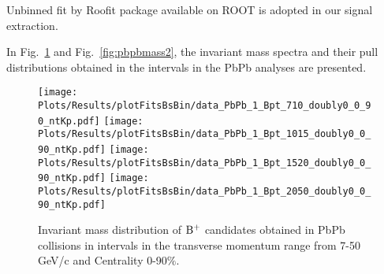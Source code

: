 Unbinned fit by Roofit package available on ROOT is adopted in our signal extraction. 
\fi

In Fig.~\ref{fig:pbpbmass1} and Fig.~\ref{fig:pbpbmass2}, the invariant mass spectra and their pull distributions obtained in the \pt intervals in the PbPb analyses are presented. %

\iffalse
\begin{figure}[h]
\begin{center}
\texttt{[image: Plots/Results/plotFits/data\_PbPb\_1\_Bpt\_57\_doubly0\_ntKp.pdf]}
\texttt{[image: Plots/Results/plotFits/data\_PbPb\_2\_Bpt\_710\_doubly0\_ntKp.pdf]}
\texttt{[image: Plots/Results/plotFits/data\_PbPb\_3\_Bpt\_1015\_doubly0\_ntKp.pdf]}
\texttt{[image: Plots/Results/plotFits/data\_PbPb\_4\_Bpt\_1520\_doubly0\_ntKp.pdf]}
\caption{Invariant mass distribution of $\Bplus$ candidates obtained in PbPb collisions in \pt intervals in the transverse momentum range from 5-20 GeV/c and Centrality 0-90$\%$.}
\label{fig:pbpbmass1}
\end{center}
\end{figure}

\begin{figure}[h]
\begin{center}
\texttt{[image: Plots/Results/plotFits/data\_PbPb\_5\_Bpt\_2030\_doubly0\_ntKp.pdf]}
\texttt{[image: Plots/Results/plotFits/data\_PbPb\_6\_Bpt\_3040\_doubly0\_ntKp.pdf]}
\texttt{[image: Plots/Results/plotFits/data\_PbPb\_7\_Bpt\_4050\_doubly0\_ntKp.pdf]}
\texttt{[image: Plots/Results/plotFits/data\_PbPb\_8\_Bpt\_5060\_doubly0\_ntKp.pdf]}
\caption{Invariant mass distribution of $\Bplus$ candidates obtained in PbPb collisions in \pt intervals in the transverse momentum range from 20-60 GeV/c and Centrality 0-90$\%$.}
\label{fig:pbpbmass2}
\end{center}
\end{figure}
\fi

\begin{figure}[h]
\begin{center}
\texttt{[image: Plots/Results/plotFitsBsBin/data\_PbPb\_1\_Bpt\_710\_doubly0\_0\_90\_ntKp.pdf]}
\texttt{[image: Plots/Results/plotFitsBsBin/data\_PbPb\_1\_Bpt\_1015\_doubly0\_0\_90\_ntKp.pdf]}
\texttt{[image: Plots/Results/plotFitsBsBin/data\_PbPb\_1\_Bpt\_1520\_doubly0\_0\_90\_ntKp.pdf]}
\texttt{[image: Plots/Results/plotFitsBsBin/data\_PbPb\_1\_Bpt\_2050\_doubly0\_0\_90\_ntKp.pdf]}
\caption{Invariant mass distribution of $\Bplus$ candidates obtained in PbPb collisions in \pt intervals in the transverse momentum range from 7-50 GeV/c and Centrality 0-90$\%$.}
\label{fig:pbpbmass1}
\end{center}
\end{figure}

